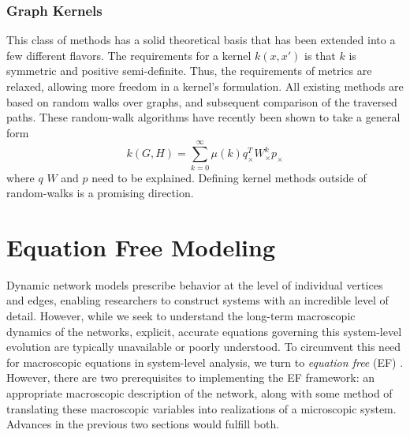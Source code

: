 \documentclass[11pt]{article}
\begin{document}
\subsubsection{Graph Kernels}
\indent This class of methods has a solid theoretical basis that has been extended into a few different flavors. The requirements for a kernel $k(x,x')$ is that $k$ is symmetric and positive semi-definite. Thus, the requirements of metrics are relaxed, allowing more freedom in a kernel's formulation. All existing methods are based on random walks over graphs, and subsequent comparison of the traversed paths. These random-walk algorithms have recently been shown to take a general form
\[
k(G,H) = \sum\limits_{k=0}^{\infty}\mu(k)q_{\times}^{T}W_{\times}^{k}p_{\times}
\]
where $q$ $W$ and $p$ need to be explained. Defining kernel methods outside of random-walks is a promising direction.
\section{Equation Free Modeling}
\indent Dynamic network models prescribe behavior at the level of individual vertices and edges, enabling researchers to construct systems with an incredible level of detail. However, while we seek to understand the long-term macroscopic dynamics of the networks, explicit, accurate equations governing this system-level evolution are typically unavailable or poorly understood. To circumvent this need for macroscopic equations in system-level analysis, we turn to \textit{equation free} (EF) . However, there are two prerequisites to implementing the EF framework: an appropriate macroscopic description of the network, along with some method of translating these macroscopic variables into realizations of a microscopic system. Advances in the previous two sections would fulfill both. 
\end{document}
